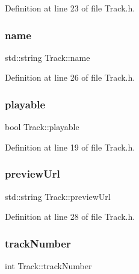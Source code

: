 Definition at line 23 of file Track.\+h.

\mbox{\label{class_track_aa6ac5b105e372efdbc1d6449cd4003a4}} 
\subsubsection{\texorpdfstring{name}{name}}
{\footnotesize\ttfamily std\+::string Track\+::name\hspace{0.3cm}{\ttfamily [private]}}



Definition at line 26 of file Track.\+h.

\mbox{\label{class_track_aaa74477dfb24cc996daa2c446d0756d7}} 
\subsubsection{\texorpdfstring{playable}{playable}}
{\footnotesize\ttfamily bool Track\+::playable\hspace{0.3cm}{\ttfamily [private]}}



Definition at line 19 of file Track.\+h.

\mbox{\label{class_track_ae04dbb4cc5e34f20e61d792bbb9d23c1}} 
\subsubsection{\texorpdfstring{preview\+Url}{previewUrl}}
{\footnotesize\ttfamily std\+::string Track\+::preview\+Url\hspace{0.3cm}{\ttfamily [private]}}



Definition at line 28 of file Track.\+h.

\mbox{\label{class_track_af56e882e909fd8dc4d3c1cda82302b3f}} 
\subsubsection{\texorpdfstring{track\+Number}{trackNumber}}
{\footnotesize\ttfamily int Track\+::track\+Number\hspace{0.3cm}{\ttfamily [private]}}



